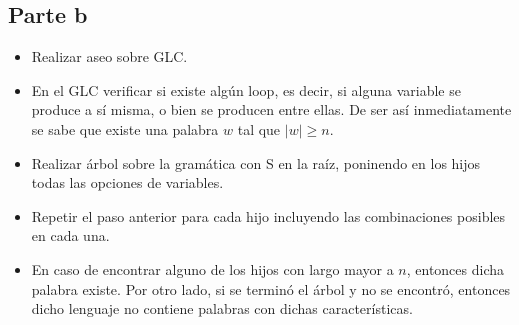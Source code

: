 \documentclass[11pt,letterpaper]{article}
\begin{document}
\subsection{Parte b}
	\begin{itemize}
		\item Realizar aseo sobre GLC.
		\item En el GLC verificar si existe algún loop, es decir, si alguna variable se produce a sí misma, o bien se producen entre ellas. De ser así inmediatamente se sabe que existe una palabra $w$ tal que $|w| \geq n$.
		\item Realizar árbol sobre la gramática con S en la raíz, poninendo en los hijos todas las opciones de variables.
		\item Repetir el paso anterior para cada hijo incluyendo las combinaciones posibles en cada una.
		\item En caso de encontrar alguno de los hijos con largo mayor a $n$, entonces dicha palabra existe. Por otro lado, si se terminó el árbol y no se encontró, entonces dicho lenguaje no contiene palabras con dichas características.
	\end{itemize}
\end{document}
